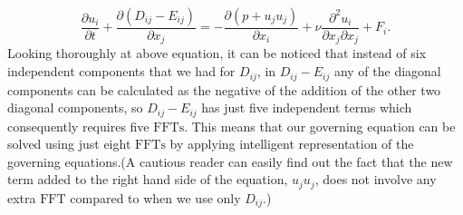 \documentclass[12pt]{article}
\begin{document}
\begin{equation}\label{eight-FFTs}
\dfrac{\partial u_i}{\partial t} + \dfrac{\partial (D_{ij}-E_{ij})}{\partial x_j} = -\dfrac{\partial (p+u_ju_j)}{\partial x_i} + \nu\dfrac{\partial^2 u_i}{\partial x_j\partial x_j} + F_i.
\end{equation}
Looking thoroughly at above equation, it can be noticed that instead of six independent components that we had for $D_{ij}$, in $D_{ij}-E_{ij}$ any of the diagonal components can be calculated as the negative of the addition of the other two diagonal components, so $D_{ij}-E_{ij}$ has just five independent terms which consequently requires five $\text{FFTs}$. This means that our governing equation can be solved using just eight $\text{FFTs}$ by applying  intelligent representation of the governing equations.(A cautious reader can easily find out the fact that the new term added to the right hand side of the equation, $u_ju_j$, does not involve any extra $\text{FFT}$ compared to when we use only $D_{ij}$.)
\end{document}

